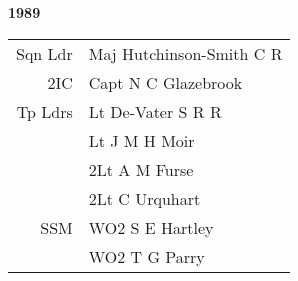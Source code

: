 \begin{center}
  \Huge
  \textbf{1989}
\end{center}

\begin{center}
  \small
  \begin{tabular}{rl}
    Sqn Ldr & Maj Hutchinson-Smith C R \\
    2IC & Capt N C Glazebrook \\
    Tp Ldrs & Lt De-Vater S R R \\
      & Lt J M H Moir \\
      & 2Lt A M Furse \\
      & 2Lt C Urquhart \\
    SSM & WO2 S E Hartley \\
      & WO2 T G Parry \\
  \end{tabular}
\end{center}

